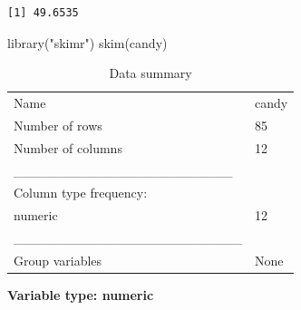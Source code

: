 \documentclass[
  letterpaper,
  DIV=11,
  numbers=noendperiod]{scrartcl}
\newenvironment{Shaded}{\begin{snugshade}}{\end{snugshade}}
\newcommand{\FunctionTok}[1]{\textcolor[rgb]{0.28,0.35,0.67}{#1}}
\newcommand{\NormalTok}[1]{\textcolor[rgb]{0.00,0.23,0.31}{#1}}
\newcommand{\StringTok}[1]{\textcolor[rgb]{0.13,0.47,0.30}{#1}}
\begin{document}
\begin{verbatim}
[1] 49.6535
\end{verbatim}

\begin{Shaded}
\begin{Highlighting}[]
\FunctionTok{library}\NormalTok{(}\StringTok{"skimr"}\NormalTok{)}
\FunctionTok{skim}\NormalTok{(candy)}
\end{Highlighting}
\end{Shaded}

\begin{longtable}[]{@{}ll@{}}
\caption{Data summary}\tabularnewline
\toprule\noalign{}
\endfirsthead
\endhead
\bottomrule\noalign{}
\endlastfoot
Name & candy \\
Number of rows & 85 \\
Number of columns & 12 \\
\_\_\_\_\_\_\_\_\_\_\_\_\_\_\_\_\_\_\_\_\_\_\_ & \\
Column type frequency: & \\
numeric & 12 \\
\_\_\_\_\_\_\_\_\_\_\_\_\_\_\_\_\_\_\_\_\_\_\_\_ & \\
Group variables & None \\
\end{longtable}

\textbf{Variable type: numeric}
\end{document}
